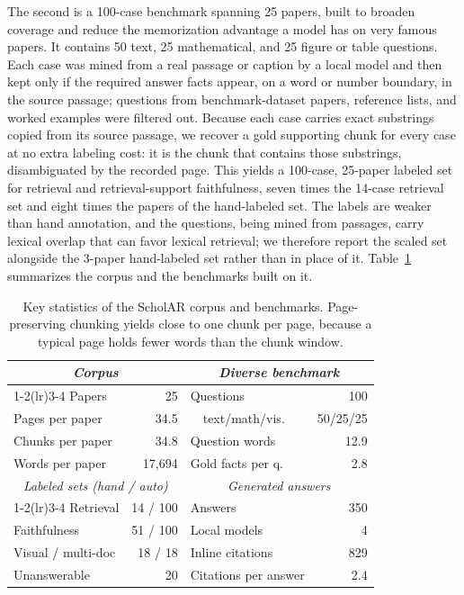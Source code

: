 \documentclass[letterpaper]{article} %
\begin{document}
The second is a 100-case benchmark spanning 25 papers, built to broaden coverage
and reduce the memorization advantage a model has on very famous papers. It contains
50 text, 25 mathematical, and 25 figure or table questions. Each case was mined from
a real passage or caption by a local model and then kept only if the required
answer facts appear, on a word or number boundary, in the source passage; questions
from benchmark-dataset papers, reference lists, and worked examples were filtered
out. Because each case carries exact substrings copied from its source passage, we
recover a gold supporting chunk for every case at no extra labeling cost: it is the
chunk that contains those substrings, disambiguated by the recorded page. This yields
a 100-case, 25-paper labeled set for retrieval and retrieval-support faithfulness, seven times
the 14-case retrieval set and eight times the papers of the hand-labeled set. The
labels are weaker than hand annotation, and the questions, being mined from passages,
carry lexical overlap that can favor lexical retrieval; we therefore report the scaled
set alongside the 3-paper hand-labeled set rather than in place of it.
Table~\ref{tab:benchstats} summarizes the corpus and the benchmarks built on it.

\begin{table}[t]
  \centering
  \caption{Key statistics of the ScholAR corpus and benchmarks. Page-preserving chunking
           yields close to one chunk per page, because a typical page holds fewer words
           than the chunk window.}
  \label{tab:benchstats}
  \small
  \setlength{\tabcolsep}{3pt}
  \begin{tabular}{lr@{\hskip 12pt}lr}
    \toprule
    \multicolumn{2}{c}{\emph{Corpus}} & \multicolumn{2}{c}{\emph{Diverse benchmark}} \\
    \cmidrule(lr){1-2}\cmidrule(lr){3-4}
    Papers            & 25       & Questions           & 100 \\
    Pages per paper   & 34.5     & \ \ text/math/vis.  & 50/25/25 \\
    Chunks per paper  & 34.8     & Question words      & 12.9 \\
    Words per paper   & 17{,}694 & Gold facts per q.   & 2.8 \\
    \midrule
    \multicolumn{2}{c}{\emph{Labeled sets (hand / auto)}} & \multicolumn{2}{c}{\emph{Generated answers}} \\
    \cmidrule(lr){1-2}\cmidrule(lr){3-4}
    Retrieval         & 14 / 100 & Answers             & 350 \\
    Faithfulness      & 51 / 100 & Local models        & 4 \\
    Visual / multi-doc& 18 / 18  & Inline citations    & 829 \\
    Unanswerable      & 20       & Citations per answer & 2.4 \\
    \bottomrule
  \end{tabular}
\end{table}
\end{document}
